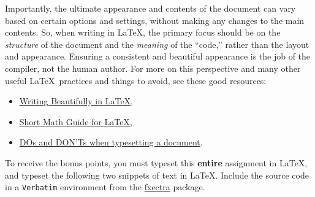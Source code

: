 \documentclass[11pt,addpoints]{exam}
\begin{document}
\begin{questions}
    Importantly, the ultimate appearance and contents of the document can vary based on certain options and settings, without making any changes to the main contents.
    So, when writing in \LaTeX, the primary focus should be on the \emph{structure} of the document and the \emph{meaning} of the ``code,'' rather than the layout and appearance.
    Ensuring a consistent and beautiful appearance is the job of the compiler, not the human author.
    For more on this perspective and many other useful \LaTeX\ practices and things to avoid, see these good resources:
    \begin{itemize}[itemsep=0pt]
    \item \href{https://www.gleave.me/post/latex-design-patterns/}{Writing Beautifully in \LaTeX},
    \item \href{https://tug.ctan.org/info/short-math-guide/short-math-guide.pdf}{Short Math Guide for \LaTeX},
    \item \href{https://chenfuture.wordpress.com/2009/02/07/dos-and-donts-when-typesetting-a-document/}{DOs and DON'Ts when typesetting a document}.
    \end{itemize}
  
  To receive the bonus points, you must typeset this \textbf{entire} assignment in \LaTeX, and typeset the following two snippets of text in \LaTeX. Include the source code in a \texttt{Verbatim} environment from the \href{https://ctan.org/pkg/fvextra}{fxectra} package. 

\ifprintanswers
\else
\newpage
\fi

\end{questions}
\end{document}
